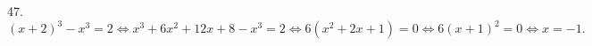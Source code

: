 47. $(x+2)^3-x^3=2\Leftrightarrow x^3+6x^2+12x+8-x^3=2\Leftrightarrow 6(x^2+2x+1)=0\Leftrightarrow6(x+1)^2=0\Leftrightarrow x=-1.$\\
